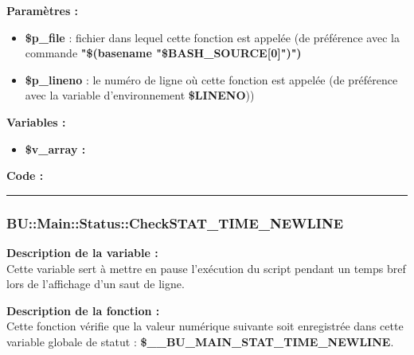 \documentclass[a4paper,10pt]{article}
\begin{document}
\begin{justify}
    \textbf{Paramètres :}

    \begin{itemize}
        \item \color{orange}\textbf{\$p\_file}\color{white} : fichier dans lequel cette fonction est appelée (de préférence avec la commande \textbf{"\$(\color{gray}basename \color{white}"\color{orange}\$BASH\_SOURCE[0]\color{white}")")}\\

        \item \color{orange}\textbf{\$p\_lineno}\color{white} : le numéro de ligne où cette fonction est appelée (de préférence avec la variable d'environnement \textbf{\color{orange}\$LINENO}))
    \end{itemize}
\end{justify}

\begin{justify}
    \textbf{Variables :}

    \begin{itemize}
        \item \textbf{\color{orange}\$v\_array\color{white} :}
    \end{itemize}
\end{justify}

\begin{justify}
    \textbf{Code :}
\end{justify}



\color{blue}\par\noindent\rule{\textwidth}{0.4pt}\color{white}

\color{blue}
\subsubsection{\color{mauve}BU::Main::Status::CheckSTAT\_TIME\_NEWLINE}\color{white}

\begin{justify}
    \textbf{Description de la variable :}\\
    Cette variable sert à mettre en pause l'exécution du script pendant un temps bref lors de l'affichage d'un saut de ligne.
\end{justify}

\begin{justify}
    \textbf{Description de la fonction :}\\
    Cette fonction vérifie que la valeur numérique suivante soit enregistrée dans cette variable globale de statut : \textbf{\color{orange}\$\_\_BU\_MAIN\_STAT\_TIME\_NEWLINE}.
\end{justify}
\end{document}
